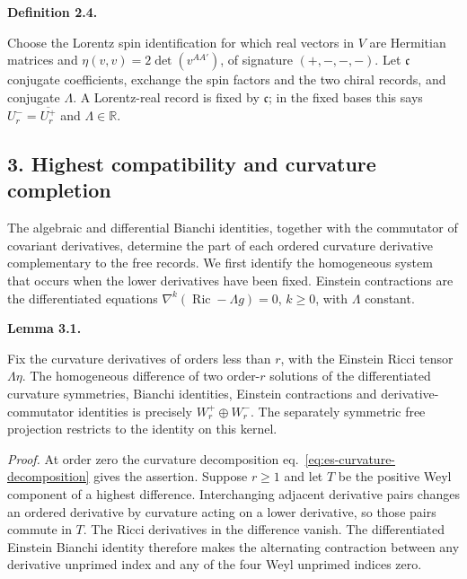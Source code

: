 \documentclass[
  english,
  11pt,
  reqno]{amsart}
\makeatletter
\newcommand{\pandocstatementheading}[1]{%
  \par\addpenalty{\@beginparpenalty}%
  \addvspace{.5\baselineskip plus .2\baselineskip minus .2\baselineskip}%
  {\normalfont\bfseries #1\par}%
  \nobreak\@afterindenttrue\@afterheading
}
\makeatother
\begin{document}
\pandocstatementheading{\protect{}\label{def:es-lorentz-involution}Definition 2.4.}

Choose the Lorentz spin identification for which real vectors in \(V\)
are Hermitian matrices and \(\eta(v,v)=2\det(v^{AA'})\), of signature
\((+,-,-,-)\). Let \(\mathfrak c\) conjugate coefficients, exchange the
spin factors and the two chiral records, and conjugate \(\Lambda\). A
Lorentz-real record is fixed by \(\mathfrak c\); in the fixed bases this
says \(U^-_r=\overline{U^+_r}\) and \(\Lambda\in\mathbb R\).

\protect{}\label{sec:es-completion}

\subsection{3. Highest compatibility and curvature
completion}\label{highest-compatibility-and-curvature-completion}

The algebraic and differential Bianchi identities, together with the
commutator of covariant derivatives, determine the part of each ordered
curvature derivative complementary to the free records. We first
identify the homogeneous system that occurs when the lower derivatives
have been fixed. Einstein contractions are the differentiated equations
\(\nabla^k(\operatorname{Ric}-\Lambda g)=0\), \(k\ge0\), with
\(\Lambda\) constant.

\pandocstatementheading{\protect{}\label{lem:es-highest-kernel}Lemma 3.1.}

Fix the curvature derivatives of orders less than \(r\), with the
Einstein Ricci tensor \(\Lambda\eta\). The homogeneous difference of two
order-\(r\) solutions of the differentiated curvature symmetries,
Bianchi identities, Einstein contractions and derivative-commutator
identities is precisely \(W_r^+\oplus W_r^-\). The separately symmetric
free projection restricts to the identity on this kernel.

\emph{Proof.} At order zero the curvature decomposition
eq.~\ref{eq:es-curvature-decomposition} gives the assertion. Suppose
\(r\ge1\) and let \(T\) be the positive Weyl component of a highest
difference. Interchanging adjacent derivative pairs changes an ordered
derivative by curvature acting on a lower derivative, so those pairs
commute in \(T\). The Ricci derivatives in the difference vanish. The
differentiated Einstein Bianchi identity therefore makes the alternating
contraction between any derivative unprimed index and any of the four
Weyl unprimed indices zero.
\end{document}
